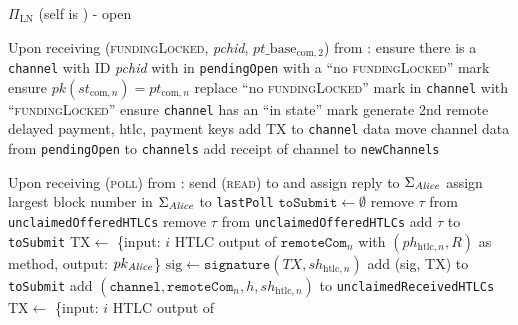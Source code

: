 \begin{protocolbox}{$\Pi_{\mathrm{LN}}$ (self is \alice) - open}
\begin{algorithmic}[1]
    \State Upon receiving (\textsc{fundingLocked}, \textit{pchid},
    $pt\_\mathrm{base}_{\mathrm{com}, 2}$) from \bob:
    \Indent
      \State ensure there is a \texttt{channel} with ID \textit{pchid} with
      \bob{} in \texttt{pendingOpen} with a ``no \textsc{fundingLocked}'' mark
      \State ensure $pk\left(st_{\mathrm{com}, n}\right) = pt_{\mathrm{com}, n}$
      \State replace ``no \textsc{fundingLocked}'' mark in \texttt{channel} with
      ``\textsc{fundingLocked}''
      \State ensure \texttt{channel} has an ``in state'' mark
      \State generate 2nd remote delayed payment, htlc, payment keys
      \State add TX to \texttt{channel} data
      \State move channel data from \texttt{pendingOpen} to \texttt{channels}
      \State add receipt of channel to \texttt{newChannels}
    \EndIndent
    \State

    \State Upon receiving (\textsc{poll}) from \environment:
    \Indent
      \State send (\textsc{read}) to \ledger{} and assign reply to
      $\Sigma_{\mathit{Alice}}$
      \State assign largest block number in $\Sigma_{\mathit{Alice}}$ to
      \texttt{lastPoll}
    \State $\mathtt{toSubmit} \gets \emptyset$
         
          \State remove $\tau$ from \texttt{unclaimedOfferedHTLCs}
          \State remove $\tau$ from \texttt{unclaimedOfferedHTLCs}
          \State add $\tau$ to \texttt{toSubmit}
        \EndIf
      \EndFor
         
              \State $\mathrm{TX} \gets$ \{input: $i$ HTLC output of
              $\mathtt{remoteCom}_n$ with $\left(ph_{\mathrm{htlc}, n},
              R\right)$ as method, output: $pk_{\mathit{Alice}}$\}
              \State $\mathrm{sig} \gets \mathtt{signature}\left(TX,
              sh_{\mathrm{htlc}, n}\right)$
              \State add (sig, TX) to \texttt{toSubmit}
            \Else
              \State add $\left(\texttt{channel}, \mathtt{remoteCom}_n, h,
              sh_{\mathrm{htlc}, n}\right)$ to \texttt{unclaimedReceivedHTLCs}
            \EndIf
          \EndFor
            \State $\mathrm{TX} \gets$ \{input: $i$ HTLC output of

\end{algorithmic}
\end{protocolbox}
